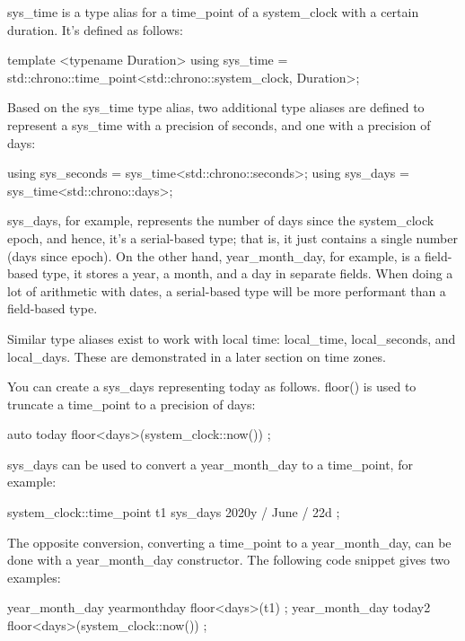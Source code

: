sys\_time is a type alias for a time\_point of a system\_clock with a certain duration. It’s defined as follows:

\begin{cpp}
template <typename Duration>
using sys_time = std::chrono::time_point<std::chrono::system_clock, Duration>;
\end{cpp}

Based on the sys\_time type alias, two additional type aliases are defined to represent a sys\_time with a precision of seconds, and one with a precision of days:

\begin{cpp}
using sys_seconds = sys_time<std::chrono::seconds>;
using sys_days = sys_time<std::chrono::days>;
\end{cpp}

sys\_days, for example, represents the number of days since the system\_clock epoch, and hence, it’s a serial-based type; that is, it just contains a single number (days since epoch). On the other hand, year\_month\_day, for example, is a field-based type, it stores a year, a month, and a day in separate fields. When doing a lot of arithmetic with dates, a serial-based type will be more performant than a field-based type.

Similar type aliases exist to work with local time: local\_time, local\_seconds, and local\_days. These are demonstrated in a later section on time zones.

You can create a sys\_days representing today as follows. floor() is used to truncate a time\_point to a precision of days:

\begin{cpp}
auto today { floor<days>(system_clock::now()) };
\end{cpp}

sys\_days can be used to convert a year\_month\_day to a time\_point, for example:

\begin{cpp}
system_clock::time_point t1 { sys_days { 2020y / June / 22d } };
\end{cpp}

The opposite conversion, converting a time\_point to a year\_month\_day, can be done with a year\_month\_day constructor. The following code snippet gives two examples:

\begin{cpp}
year_month_day yearmonthday { floor<days>(t1) };
year_month_day today2 { floor<days>(system_clock::now()) };
\end{cpp}


